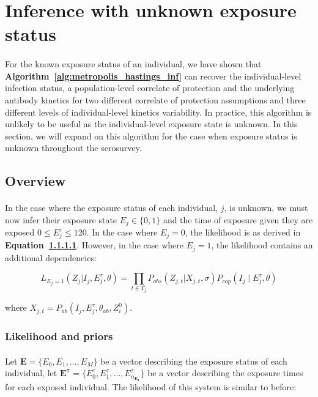 

\newpage
\section{Inference with unknown exposure status}

\paragraph{}For the known exposure status of an individual, we have shown that \textbf{Algorithm~\ref{alg:metropolis_hastings_inf}} can recover the individual-level infection status, a population-level correlate of protection and the underlying antibody kinetics for two different correlate of protection assumptions and three different levels of individual-level kinetics variability. In practice, this algorithm is unlikely to be useful as the individual-level exposure state is unknown. In this section, we will expand on this algorithm for the case when exposure status is unknown throughout the serosurvey. 

\subsection{Overview}

\paragraph{}In the case where the exposure status of each individual, $j$, is unknown, we must now infer their exposure state $E_j \in \{0, 1\}$ and the time of exposure given they are exposed $0 \leq E_j^\tau \leq 120$. In the case where $E_j = 0$, the likelihood is as derived in \textbf{Equation~\ref{}}. However, in the case where $E_j = 1$, the likelihood contains an additional dependencies:

\begin{equation}
L_{E_j = 1}(Z_{j}| I_j, E_j^\tau, \theta) = \prod_{t \in T_j}P_{obs}(Z_{j,t}|X_{j,t}, \sigma)P_{cop}(I_j \mid  E^\tau_{j}, \theta)
\end{equation}

where $X_{j,t} =P_{ab}( I_j,  E_j^\tau, \theta_{ab}, Z^0_i) $.

\subsubsection{Likelihood and priors}

\paragraph{}Let $\mathbf{E} = \{E_0, E_1, \dots, E_{M}\}$ be a vector describing the exposure status of each individual, let $\mathbf{E^{\tau}} = \{E^{\tau}_0, E^{\tau}_1, \dots, E^{\tau}_{n_\mathbf{E_1}}\}$ be a vector describing the exposure times for each exposed individual. The likelihood of this system is similar to before:

